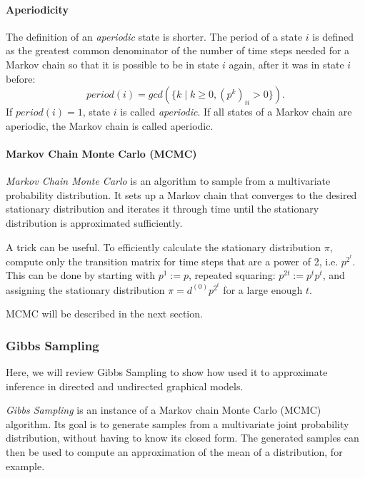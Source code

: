 \paragraph{Aperiodicity}

The definition of an \emph{aperiodic} state is shorter.
The period of a state $i$ is defined as
the greatest common denominator of the number of time steps needed
for a Markov chain so that it is possible to be in state $i$ again,
after it was in state $i$ before: 
\[
period(i)=gcd(\{k\mid k\geq0,(p^{k})_{ii}>0\}).
\]
If $period(i)=1$, state $i$ is called \emph{aperiodic}. If all states
of a Markov chain are aperiodic, the Markov chain is called aperiodic.

\paragraph{Markov Chain Monte Carlo (MCMC)}

\emph{Markov Chain Monte Carlo}
is an algorithm to sample from a multivariate probability distribution.
It sets up a Markov chain that converges to the desired stationary
distribution and iterates it through time until the stationary distribution
is approximated sufficiently.

A trick can be useful. To efficiently calculate the stationary distribution
$\pi$, compute only the transition matrix for time steps that are
a power of 2, i.e. $p^{2^{t}}$. This can be done by starting with
$p^{1}:=p$, repeated squaring: $p^{2t}:=p^{t}p^{t}$, and assigning
the stationary distribution $\pi=d^{(0)}p^{2^{t}}$ for a large enough
$t$.

MCMC will be described in the next section. 

\subsubsection{Gibbs Sampling}

Here, we will review Gibbs Sampling to show how \cite{Neal1993} used
it to approximate inference in directed and undirected graphical models.

\emph{Gibbs Sampling} \cite{GemanGeman1984}
is an instance of a Markov chain Monte Carlo (MCMC) algorithm. Its
goal is to generate samples from a multivariate joint probability
distribution, without having to know its closed form. The generated
samples can then be used to compute an approximation of the mean of
a distribution, for example.

